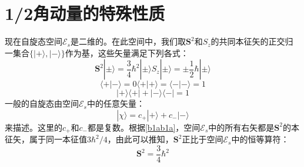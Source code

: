 \documentclass[]{article}
\begin{document}
\section{1/2角动量的特殊性质}
现在自旋态空间$\mathscr{E}_s$是二维的。在此空间中，我们取$\boldsymbol{S}^2$和$S_z$的共同本征矢的正交归一集合$\{|+\rangle,|-\rangle\}$作为基，这些矢量满足下列各式：
\begin{subequations}
	\begin{equation}
		\boldsymbol{S}^2|\pm\rangle=\dfrac{3}{4}\hbar^2|\pm\rangle
		\label{b1ab1a}
	\end{equation}
	\begin{equation}
		S_z|\pm\rangle=\pm\dfrac{1}{2}\hbar|\pm\rangle
		\label{b1bb1b}
	\end{equation}
\end{subequations}
\begin{subequations}
	\begin{equation}
		\langle+|-\rangle=0
	\end{equation}
	\begin{equation}
		\langle+|+\rangle=\langle-|-\rangle=1
	\end{equation}
\end{subequations}
\begin{equation}
	|+\rangle\langle+|+|-\rangle\langle-|=1
\end{equation}
一般的自旋态由空间$\mathscr{E}_s$中的任意矢量：
\begin{equation}
	|\chi\rangle=c_+|+\rangle+c_-|-\rangle
\end{equation}
来描述。这里的$c_+$和$c_-$都是复数。根据\eqref{b1ab1a}，空间$\mathscr{E}_s$中的所有右矢都是$\boldsymbol{S}^2$的本征矢，属于同一本征值$3\hbar^2/4$，由此可以推知，$\boldsymbol{S}^2$正比于空间$\mathscr{E}_s$中的恒等算符：
\begin{equation}
	\boldsymbol{S}^2=\dfrac{3}{4}\hbar^2
\end{equation}
\end{document}
